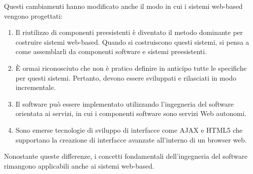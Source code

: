 Questi cambiamenti hanno modificato anche il modo in cui i sistemi web-based vengono progettati:
\begin{enumerate}
    \item Il riutilizzo di componenti preesistenti è diventato il metodo dominante per costruire sistemi web-based. Quando si costruiscono questi sistemi, si pensa a come assemblarli da componenti software e sistemi preesistenti.
    \item È ormai riconosciuto che non è pratico definire in anticipo tutte le specifiche per questi sistemi. Pertanto, devono essere sviluppati e rilasciati in modo incrementale.
    \item Il software può essere implementato utilizzando l'ingegneria del software orientata ai servizi, in cui i componenti software sono servizi Web autonomi.
    \item Sono emerse tecnologie di sviluppo di interfacce come AJAX e HTML5 che supportano la creazione di interfacce avanzate all'interno di un browser web.
\end{enumerate}
Nonostante queste differenze, i concetti fondamentali dell'ingegneria del software rimangono applicabili anche ai sistemi web-based.

